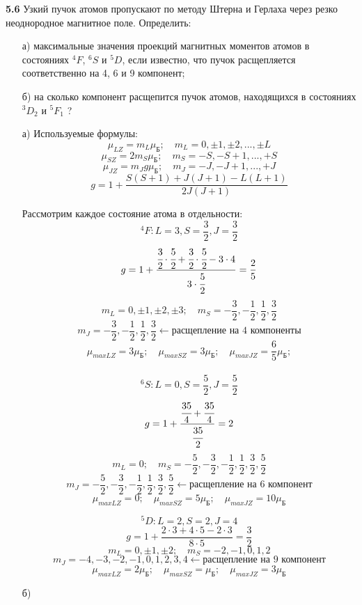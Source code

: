 	\textbf{5.6 }
		Узкий пучок атомов пропускают по методу Штерна и Герлаха через резко
		неоднородное магнитное поле. Определить: 
		\vspace*{-1em}
		\begin{itemize}\itemsep-8pt
			\item[а)] максимальные значения проекций магнитных моментов 
			атомов в состояниях \(^4F \), \( ^6S \) и \( ^5D \), если
			известно, что пучок расщепляется соответственно на 4, 6 и 9 компонент;
			\item[б)] на сколько компонент расщепится пучок атомов, 
			находящихся в состояниях \( ^3D_2 \) и \( ^5F_1 \) ?
		\end{itemize}
		\vspace*{-1em}
		\begin{itemize}\itemsep-8pt
			\item[а)] Используемые формулы:
			\[ 
				\mu_{LZ} = m_L\mu_\text{Б};\quad
				m_L = 0, \pm1, \pm2, ..., \pm L 
			\]
			\[ 
				\mu_{SZ} = 2m_S\mu_\text{Б};\quad
				m_S = -S, -S+1, ..., +S  
			\]
			\[ 
				\mu_{JZ} = m_J g\mu_\text{Б};\quad
				m_J = -J, -J+1, ..., +J  
			\]
			\[ g = 1 + \frac{S(S+1)+J(J+1)-L(L+1)}{2J(J+1)} \]

			Рассмотрим каждое состояние атома в отдельности:
			\[ ^4F: L=3, S=\frac{3}{2}, J= \frac{3}{2} \]
			\[ 
				g = 1 + \frac{\cfrac{3}{2}\cdot\cfrac{5}{2} 
				+ \cfrac{3}{2}\cdot\cfrac{5}{2} - 3\cdot4}{3\cdot\cfrac{5}{2}} 
				= \frac{2}{5}  
			\]
			\[ 
				m_L = 0, \pm1, \pm2, \pm3;\quad
				m_S = -\frac{3}{2}, -\frac{1}{2}, \frac{1}{2}, \frac{3}{2}
			\]
			\[
				m_J = -\frac{3}{2}, -\frac{1}{2}, \frac{1}{2}, \frac{3}{2} \leftarrow 
				\text{расщепление на 4 компоненты}
			\]
			\[ 
				\mu_{maxLZ} = 3\mu_\text{Б};\quad
				\mu_{maxSZ} = 3\mu_\text{Б};\quad
				\mu_{maxJZ} = \frac{6}{5}\mu_\text{Б};
			\] \\

			\[ ^6S: L=0, S=\frac{5}{2}, J= \frac{5}{2} \]
			\[ g = 1 + \frac{\cfrac{35}{4}+\cfrac{35}{4}}{\cfrac{35}{2}} = 2\]
			\[ 
				m_L = 0;\quad
				m_S = -\frac{5}{2}, -\frac{3}{2}, -\frac{1}{2}, 
				\frac{1}{2}, \frac{3}{2}, \frac{5}{2}
			\]
			\[
				m_J = -\frac{5}{2}, -\frac{3}{2}, -\frac{1}{2}, \frac{1}{2}, 
				\frac{3}{2}, \frac{5}{2} \leftarrow \text{расщепление на 6 компонент}
			\]
			\[ 
				\mu_{maxLZ} = 0;\quad
				\mu_{maxSZ} = 5\mu_\text{Б};\quad
				\mu_{maxJZ} = 10\mu_\text{Б}
			\]

			\[ ^5D: L=2, S=2, J=4\]
			\[ g = 1 + \frac{2\cdot3 + 4\cdot5 - 2\cdot3}{8\cdot5} = \frac{3}{2}\]
			\[ 
				m_L = 0, \pm1, \pm2;\quad
				m_S = -2, -1, 0, 1, 2
			\]
			\[
				m_J = -4, -3, -2, -1, 0, 1, 2, 3, 4 \leftarrow 
				\text{расщепление на 9 компонент}
			\]
			\[ 
				\mu_{maxLZ} = 2\mu_\text{Б};\quad
				\mu_{maxSZ} = \mu_\text{Б};\quad
				\mu_{maxJZ} = 3\mu_\text{Б}
			\]
			\item[б)]
		\end{itemize}

